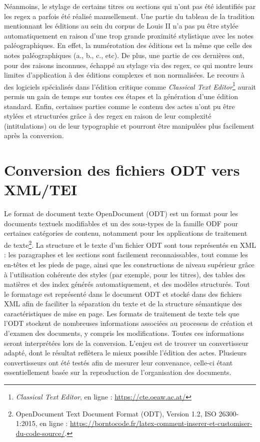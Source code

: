 \par Néanmoins, le stylage de certains titres ou sections qui n’ont pas été identifiés par les regex a parfois été réalisé manuellement. Une partie du tableau de la tradition mentionnant les éditions au sein du corpus de Louis II n'a pas pu être stylée automatiquement en raison d'une trop grande proximité stylistique avec les notes paléographiques. En effet, la numérotation des éditions est la même que celle des notes paléographiques (a., b., c., etc). De plus, une partie de ces dernières ont, pour des raisons inconnues, échappé au stylage via des regex, ce qui montre leurs limites d'application à des éditions complexes et non normalisées. Le recours à des logiciels spécialisés dans l’édition critique comme \textit{Classical Text Editor}\footnote{\textit{Classical Text Editor}, en ligne : \url{https://cte.oeaw.ac.at/}} aurait permis un gain de temps sur toutes ces étapes et la génération d'une édition standard. Enfin, certaines parties comme le contenu des actes n’ont pu être stylées et structurées grâce à des regex en raison de leur complexité (intitulations) ou de leur typographie et pourront être manipulées plus facilement après la conversion.

\newpage
\thispagestyle{empty}
\mbox{}
\newpage

\chapter{Conversion des fichiers ODT vers XML/TEI}

\par Le format de document texte OpenDocument (ODT) est un format pour les documents textuels modifiables et un des sous-types de la famille ODF pour certaines catégories de contenu, notamment pour les applications de traitement de texte\footnote{OpenDocument Text Document Format (ODT), Version 1.2, ISO 26300-1:2015, en ligne : \url{https://borntocode.fr/latex-comment-inserer-et-customiser-du-code-source/}.}. La structure et le texte d’un fichier ODT sont tous représentés en XML : les paragraphes et les sections sont facilement reconnaissables, tout comme les en-têtes et les pieds de page, ainsi que les constructions de niveau supérieur grâce à l’utilisation cohérente des styles (par exemple, pour les titres), des tables des matières et des index générés automatiquement, et des modèles structurés. Tout le formatage est représenté dans le document ODT et stocké dans des fichiers XML afin de faciliter la séparation du texte et de la structure sémantique des caractéristiques de mise en page. Les formats de traitement de texte tels que l’ODT stockent de nombreuses informations associées au processus de création et d’examen des documents, y compris les modifications. Toutes ces informations seront interprétées lors de la conversion. L’enjeu est de trouver un convertisseur adapté, dont le résultat reflètera le mieux possible l'édition des actes. Plusieurs convertisseurs ont été testés afin de mesurer leur convenance, celle-ci étant essentiellement basée sur la reproduction de l’organisation des documents. 
\newpage 

